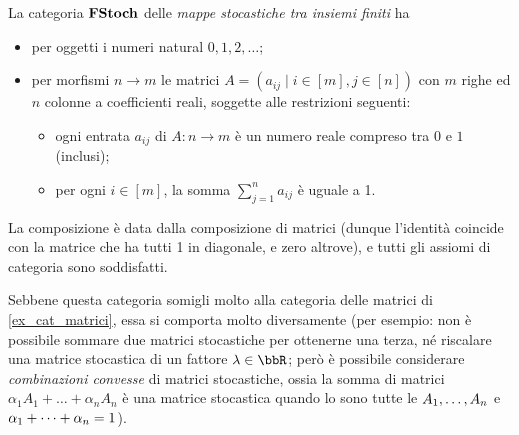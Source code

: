 \begin{example}\label{cat_stocazziche}
	La categoria \(\mathbf{FStoch}\) delle \emph{mappe stocastiche tra insiemi finiti} ha
	\begin{itemize}
		\item per oggetti i numeri natural \(0,1,2,\dots\);
		\item per morfismi \(n\to m\) le matrici \(A=(a_{ij}\mid i\in [m], j\in[n])\) con \(m\) righe ed \(n\) colonne a coefficienti reali, soggette alle restrizioni seguenti:
		      \begin{itemize}
			      \item ogni entrata \(a_{ij}\) di \(A : n\to m\) è un numero reale compreso tra \(0\) e \(1\) (inclusi);
			      \item per ogni \(i\in[m]\), la somma \(\sum_{j=1}^n a_{ij}\) è uguale a 1.
		      \end{itemize}
	\end{itemize}
	La composizione è data dalla composizione di matrici (dunque l'identità coincide con la matrice che ha tutti 1 in diagonale, e zero altrove), e tutti gli assiomi di categoria sono soddisfatti.

	Sebbene questa categoria somigli molto alla categoria delle matrici di \ref{ex_cat_matrici}, essa si comporta molto diversamente (per esempio: non è possibile sommare due matrici stocastiche per ottenerne una terza, né riscalare una matrice stocastica di un fattore \(\lambda\in\bbR\); però è possibile considerare \emph{combinazioni convesse} di matrici stocastiche, ossia la somma di matrici \(\alpha_1 A_1+\dots + \alpha_n A_n\) è una matrice stocastica quando lo sono tutte le \(\tup An,\) e \(\tup\alpha n+ = 1\)).
\end{example}
